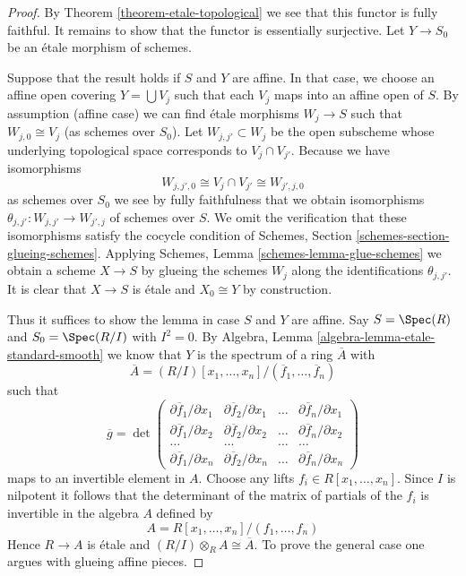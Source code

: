 \begin{proof}
By Theorem \ref{theorem-etale-topological}
we see that this functor is fully faithful.
It remains to show that the functor is essentially surjective.
Let $Y \to S_0$ be an \'etale morphism of schemes.

\medskip\noindent
Suppose that the result holds if $S$ and $Y$ are affine.
In that case, we choose an affine open covering
$Y = \bigcup V_j$ such that each $V_j$ maps
into an affine open of $S$. By assumption (affine case) we can
find \'etale morphisms $W_j \to S$ such that $W_{j, 0} \cong V_j$
(as schemes over $S_0$). Let $W_{j, j'} \subset W_j$
be the open subscheme whose underlying topological space
corresponds to $V_j \cap V_{j'}$. Because we have isomorphisms
$$
W_{j, j', 0} \cong V_j \cap V_{j'} \cong W_{j', j, 0}
$$
as schemes over $S_0$ we see by fully faithfulness that we
obtain isomorphisms
$\theta_{j, j'} : W_{j, j'} \to W_{j', j}$ of schemes over $S$.
We omit the verification that these isomorphisms satisfy the
cocycle condition of Schemes, Section \ref{schemes-section-glueing-schemes}.
Applying Schemes, Lemma \ref{schemes-lemma-glue-schemes}
we obtain a scheme $X \to S$ by
glueing the schemes $W_j$ along the identifications $\theta_{j, j'}$.
It is clear that $X \to S$ is \'etale and $X_0 \cong Y$ by construction.

\medskip\noindent
Thus it suffices to show the lemma in case $S$ and $Y$ are affine.
Say $S = \Spec(R)$ and $S_0 = \Spec(R/I)$ with $I^2 = 0$.
By Algebra, Lemma \ref{algebra-lemma-etale-standard-smooth} we know that
$Y$ is the spectrum of a ring $\overline{A}$ with
$$
\overline{A} = (R/I)[x_1, \ldots, x_n]/(\overline{f}_1, \ldots, \overline{f}_n)
$$
such that
$$
\overline{g} =
\det
\left(
\begin{matrix}
\partial \overline{f}_1/\partial x_1 &
\partial \overline{f}_2/\partial x_1 &
\ldots &
\partial \overline{f}_n/\partial x_1 \\
\partial \overline{f}_1/\partial x_2 &
\partial \overline{f}_2/\partial x_2 &
\ldots &
\partial \overline{f}_n/\partial x_2 \\
\ldots & \ldots & \ldots & \ldots \\
\partial \overline{f}_1/\partial x_n &
\partial \overline{f}_2/\partial x_n &
\ldots &
\partial \overline{f}_n/\partial x_n
\end{matrix}
\right)
$$
maps to an invertible element in $A$. Choose any lifts
$f_i \in R[x_1, \ldots, x_n]$. Since $I$ is nilpotent it
follows that the determinant of the matrix of partials of the
$f_i$ is invertible in the algebra $A$ defined by
$$
A = R[x_1, \ldots, x_n]/(f_1, \ldots, f_n)
$$
Hence $R \to A$ is \'etale and $(R/I) \otimes_R A \cong \overline{A}$.
To prove the general case one argues with glueing affine pieces.
\end{proof}



